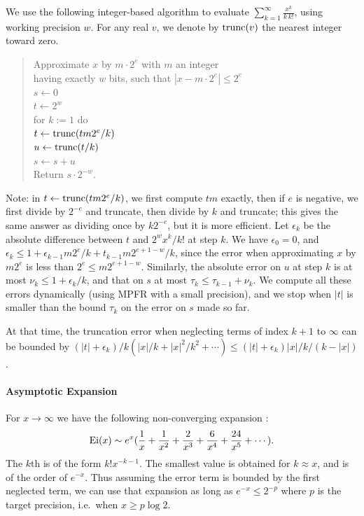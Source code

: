 \documentclass[12pt]{amsart}
\def\q{\hspace*{5mm}}
\begin{document}
We use the following integer-based algorithm to evaluate
$\sum_{k=1}^{\infty} \frac{x^k}{k \, k!}$, using working precision $w$.
For any real $v$, we denote by ${\rm trunc}(v)$ the nearest integer
toward zero.
\begin{quote}
Approximate $x$ by  $m\cdot2^e$ with $m$ an integer \\
having exactly $w$ bits, such that $|x - m\cdot2^e| \leq 2^e$ \\
$s \leftarrow 0$ \\ %
$t \leftarrow 2^w$ \\ %
for $k := 1$ do \\
\q $t \leftarrow {\rm trunc}(t m 2^e/k)$ \\
\q $u \leftarrow {\rm trunc}(t/k)$ \\
\q $s \leftarrow s + u$ \\
Return $s \cdot 2^{-w}$.
\end{quote}
Note: in $t \leftarrow {\rm trunc}(t m 2^e/k)$,
we first compute $tm$ exactly, then if $e$ is negative,
we first divide by $2^{-e}$ and
truncate, then divide by $k$ and truncate; this gives the same answer as
dividing once by $k 2^{-e}$, but it is more efficient.
Let $\epsilon_k$ be the absolute difference between $t$ and
$2^w x^k/k!$ at step $k$.
We have $\epsilon_0=0$, and $\epsilon_k \leq 1 + \epsilon_{k-1} m 2^e/k
+ t_{k-1} m 2^{e+1-w}/k$, since the error when approximating $x$ by
$m 2^e$ is less than $2^e \leq m 2^{e+1-w}$.
Similarly, the absolute error on $u$ at step $k$ is at most
$\nu_k \leq 1 + \epsilon_k/k$,
and that on $s$ at most $\tau_k \leq \tau_{k-1} + \nu_k$.
We compute all these errors dynamically (using MPFR with a small precision),
and we stop when $|t|$ is smaller than the bound $\tau_k$
on the error on $s$ made so far.

At that time, the truncation error when neglecting terms of index $k+1$
to $\infty$ can be bounded by $(|t| + \epsilon_k)/k (|x|/k + |x|^2/k^2 +
\cdots) \leq (|t| + \epsilon_k) |x|/k/(k-|x|)$.

\bigskip

\paragraph{Asymptotic Expansion}

For $x \rightarrow \infty$ we have the following non-converging
expansion \cite[formula 5.1.51]{AbSt73}:
\[ {\rm Ei}(x) \sim e^x (\frac{1}{x} + \frac{1}{x^2} + \frac{2}{x^3}
    + \frac{6}{x^4} + \frac{24}{x^5} + \cdots). \]
The $k$th is of the form $k! x^{-k-1}$. The smallest value is obtained for
$k \approx x$, and is of the order of $e^{-x}$. Thus assuming the error
term is bounded by the first neglected term, we can use that expansion
as long as $e^{-x} \leq 2^{-p}$ where $p$ is the target precision,
i.e.~when $x \geq p \log 2$.
\end{document}
